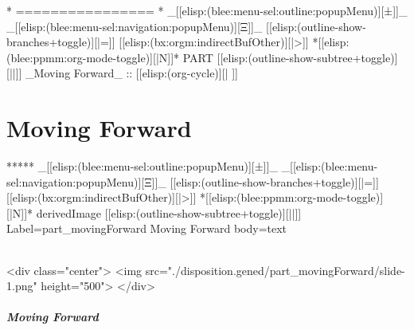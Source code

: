 \begin{whenOrg}
\begin{verblatex}
\begin{frame}[fragile,plain,label=lcntBleePanelsVideo]
{}

\end{frame}
\end{verblatex}


\begin{whenOrg}
*      ================
*  _[[elisp:(blee:menu-sel:outline:popupMenu)][±]]_ _[[elisp:(blee:menu-sel:navigation:popupMenu)][Ξ]]_ [[elisp:(outline-show-branches+toggle)][|=]] [[elisp:(bx:orgm:indirectBufOther)][|>]] *[[elisp:(blee:ppmm:org-mode-toggle)][|N]]*  PART       [[elisp:(outline-show-subtree+toggle)][||]]   _Moving Forward_ ::  [[elisp:(org-cycle)][| ]]
\end{whenOrg}

\newpage
\part{Moving Forward}


\begin{whenOrg}
*****  _[[elisp:(blee:menu-sel:outline:popupMenu)][±]]_ _[[elisp:(blee:menu-sel:navigation:popupMenu)][Ξ]]_ [[elisp:(outline-show-branches+toggle)][|=]] [[elisp:(bx:orgm:indirectBufOther)][|>]] *[[elisp:(blee:ppmm:org-mode-toggle)][|N]]*  derivedImage [[elisp:(outline-show-subtree+toggle)][||]] Label=part_movingForward Moving Forward body=text
\end{whenOrg}

\begin{htmlonly}

\begin{frame}[fragile,plain,label=part_movingForward]
    \frametitle{}
    \framesubtitle{}
    \begin{rawhtml}
<div class="center">
<img src="./disposition.gened/part_movingForward/slide-1.png" height="500">
</div>
    \end{rawhtml}
\end{frame}
\end{htmlonly}

\begin{verblatex}

\begin{frame}[fragile,label=part_movingForward]
    \frametitle{Moving Forward}
    \framesubtitle{}


\end{frame}
\end{verblatex}
\end{whenOrg}
